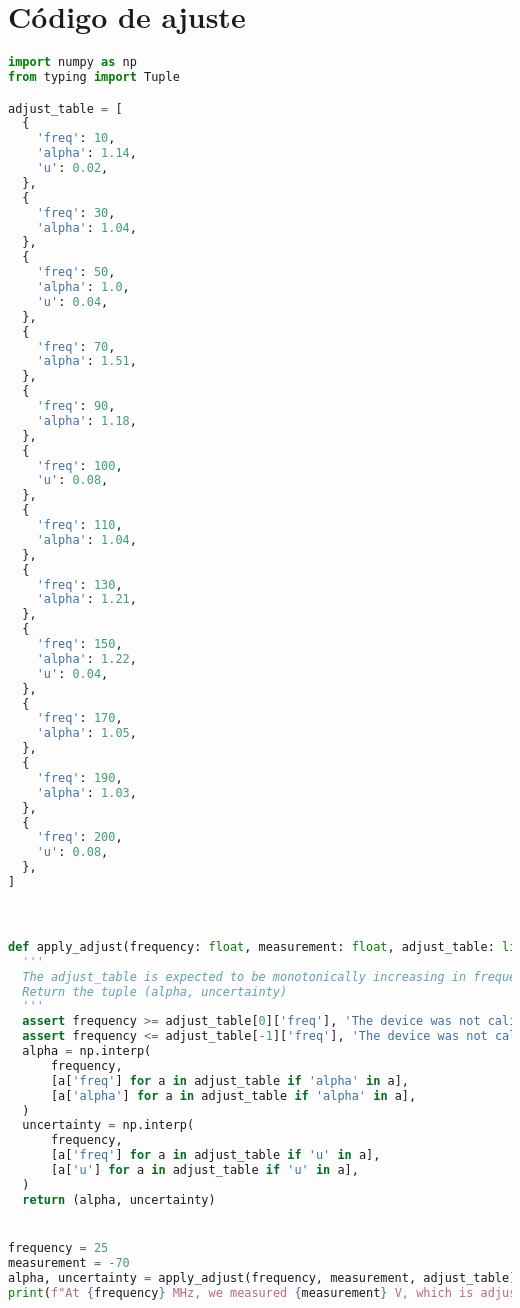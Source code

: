\chapter{Código de ajuste}

\begin{lstlisting}[language=Python]
import numpy as np
from typing import Tuple

adjust_table = [
  {
    'freq': 10,
    'alpha': 1.14,
    'u': 0.02,
  },
  {
    'freq': 30,
    'alpha': 1.04,
  },
  {
    'freq': 50,
    'alpha': 1.0,
    'u': 0.04,
  },
  {
    'freq': 70,
    'alpha': 1.51,
  },
  {
    'freq': 90,
    'alpha': 1.18,
  },
  {
    'freq': 100,
    'u': 0.08,
  },
  {
    'freq': 110,
    'alpha': 1.04,
  },
  {
    'freq': 130,
    'alpha': 1.21,
  },
  {
    'freq': 150,
    'alpha': 1.22,
    'u': 0.04,
  },
  {
    'freq': 170,
    'alpha': 1.05,
  },
  {
    'freq': 190,
    'alpha': 1.03,
  },
  {
    'freq': 200,
    'u': 0.08,
  },
]



def apply_adjust(frequency: float, measurement: float, adjust_table: list) -> Tuple[float, float]:
  '''
  The adjust_table is expected to be monotonically increasing in frequency
  Return the tuple (alpha, uncertainty)
  '''
  assert frequency >= adjust_table[0]['freq'], 'The device was not calibrated for this frequency range'
  assert frequency <= adjust_table[-1]['freq'], 'The device was not calibrated for this frequency range'
  alpha = np.interp(
      frequency, 
      [a['freq'] for a in adjust_table if 'alpha' in a],
      [a['alpha'] for a in adjust_table if 'alpha' in a],
  )
  uncertainty = np.interp(
      frequency, 
      [a['freq'] for a in adjust_table if 'u' in a], 
      [a['u'] for a in adjust_table if 'u' in a],
  )
  return (alpha, uncertainty)


frequency = 25
measurement = -70
alpha, uncertainty = apply_adjust(frequency, measurement, adjust_table)
print(f"At {frequency} MHz, we measured {measurement} V, which is adjusted to {measurement*alpha}+-{uncertainty} V\t\t(alpha={alpha})")
\end{lstlisting}